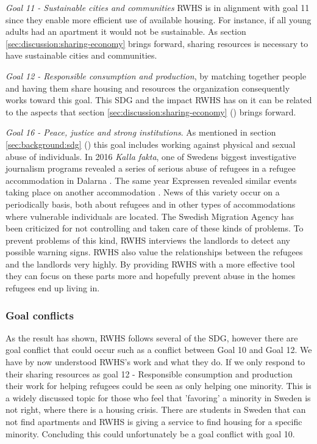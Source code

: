 \textit{Goal 11 - Sustainable cities and communities} 
RWHS is in alignment with goal 11 since they enable more efficient use of available housing. For instance, if all young adults had an apartment it would not be sustainable. As section \ref{sec:discussion:sharing-economy} brings forward, sharing resources is necessary to have sustainable cities and communities. 
\cite{UnitedNationsb}

\textit{Goal 12 - Responsible consumption and production}, by matching together people and having them share housing and resources the organization consequently works toward this goal. This SDG and the impact RWHS has on it can be related to the aspects that section \ref{sec:discussion:sharing-economy} (\textit{}) brings forward.

\textit{Goal 16 - Peace, justice and strong institutions}. As mentioned in section \ref{sec:background:sdg} (\textit{}) this goal includes working against physical and sexual abuse of individuals. In 2016 \textit{Kalla fakta}, one of Swedens biggest investigative journalism programs revealed a series of serious abuse of refugees in a refugee accommodation in Dalarna \cite{TV4KallaTv4.se}. The same year Expressen revealed similar events taking place on another accommodation \cite{RoosAsylrapporten:Asylboendet}. News of this variety occur on a periodically basis, both about refugees and in other types of accommodations where vulnerable individuals are located. The Swedish Migration Agency has been criticized for not controlling and taken care of these kinds of problems. To prevent problems of this kind, RWHS interviews the landlords to detect any possible warning signs. RWHS also value the relationships between the refugees and the landlords very highly. By providing RWHS with a more effective tool they can focus on these parts more and hopefully prevent abuse in the homes refugees end up living in.  
 
\subsubsection{Goal conflicts}
As the result has shown, RWHS follows several of the SDG, however there are goal conflict that could occur such as a conflict between Goal 10 and Goal 12. We have by now understood RWHS's work and what they do. If we only respond to their sharing resources as goal 12 - Responsible consumption and production their work for helping refugees could be seen as only helping one minority. This is a widely discussed topic for those who feel that 'favoring' a minority in Sweden is not right, where there is a housing crisis. There are students in Sweden that can not find apartments and RWHS is giving a service to find housing for a specific minority. Concluding this could unfortunately be a goal conflict with goal 10.

